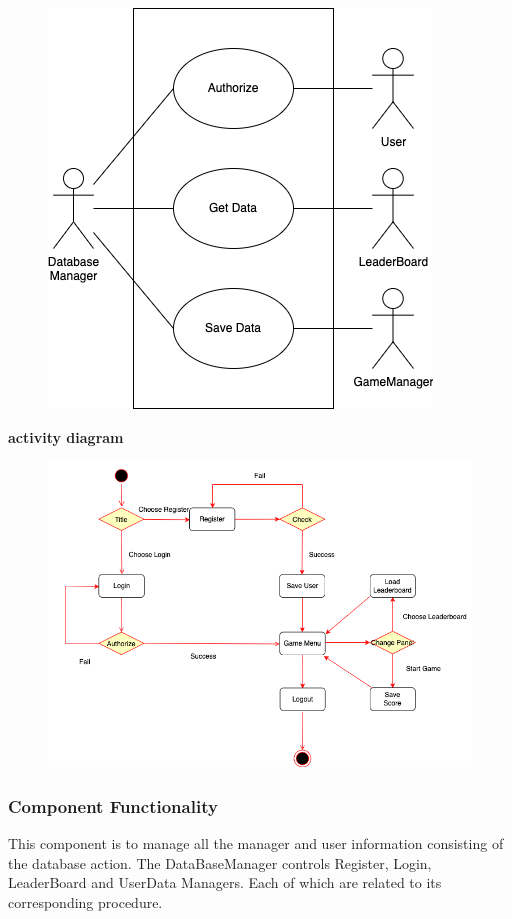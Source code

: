 \documentclass[11pt]{article}
\begin{document}
\begin{figure}[H]
    \centering
    \includegraphics*[scale=0.4]{Database_use-case.png}
\end{figure}
\textbf{activity diagram}\\
\begin{figure}[H]
    \centering
    \includegraphics*[scale=0.4]{Database_Activity.png}
\end{figure}
\subsubsection{Component Functionality}
This component is to manage all the manager and user information consisting of the database action. The DataBaseManager controls Register, Login, LeaderBoard and UserData Managers. Each of which are related to its corresponding procedure.
\end{document}
